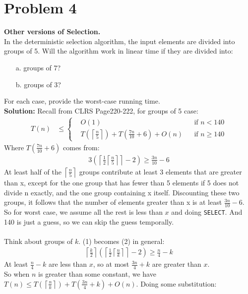 \documentclass{article}
\begin{document}
\pagebreak
\section*{Problem 4}
\textbf{Other versions of Selection.}\\
In the deterministic selection algorithm, the input elements are divided into groups of 5. Will the algorithm work in linear time if they are divided into:
\begin{enumerate}
    \item[a.] groups of 7?
    \item[b.] groups of 3?
\end{enumerate}
For each case, provide the worst-case running time.\\
\textbf{Solution:}
Recall from CLRS Page220-222, for groups of 5 case:
\begin{align*}
T(n) &\leq \left\{
\begin{aligned}
&O(1) && \text{if } n < 140 \\
&T(\left\lceil \frac{n}{5} \right\rceil) + T\left(\frac{7n}{10} + 6\right) + O(n) && \text{if } n \geq 140
\end{aligned}
\right.
\end{align*}
Where $T\left(\frac{7n}{10} + 6\right)$ comes from:
\begin{align}
    3 \left( \left\lceil \frac{1}{2} \left\lceil \frac{n}{5} \right\rceil\right\rceil  - 2 \right) \geq \frac{3n}{10} - 6
\end{align}
At least half of the $\left\lceil \frac{n}{5} \right\rceil$ groups contribute at least 3 elements that are greater than x, except for the one group that has fewer than 5 elements if 5 does not divide n exactly, and the one group containing x itself. Discounting these two groups, it follows that the number of elements greater than x is at least $\frac{3n}{10} - 6$. So for worst case, we assume all the rest is less than $x$ and doing \texttt{SELECT}. And 140 is just a guess, so we can skip the guess temporally.\\\\
Think about groups of $k$. (1) becomes (2) in general:
\begin{align}
     \left\lceil \frac{k}{2} \right\rceil\left( \left\lceil \frac{1}{2} \left\lceil \frac{n}{k} \right\rceil\right\rceil  - 2 \right) \geq \frac{n}{4} - k
\end{align}
At least $\frac{n}{4} - k$ are less than $x$, so at most $\frac{3n}{4} + k$ are greater than $x$.\\
So when $n$ is greater than some constant, we have $T(n) \leq T(\left\lceil \frac{n}{k} \right\rceil) + T(\frac{3n}{4} + k) + O(n)$. Doing some substitution:
\end{document}
